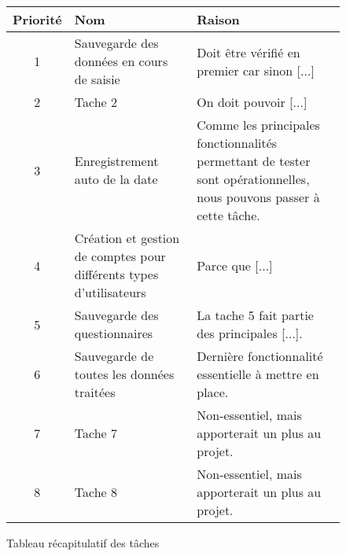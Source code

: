 \begin{figure}[H]
    \begin{center}
        \begin{tabularx}{17cm}{|c|p{6cm}|X|}
            \hline
            Priorité & Nom & Raison\\
            \hline
            1 & Sauvegarde des données en cours
            de saisie & Doit être vérifié en premier car sinon [...] \tabularnewline
            2 & Tache 2 & On doit pouvoir [...] \tabularnewline
            3 & Enregistrement auto de la date & Comme les principales fonctionnalités permettant de tester sont opérationnelles, nous pouvons passer à cette tâche. \tabularnewline
            4 & Création et gestion de comptes
            pour différents types d’utilisateurs & Parce que [...] \tabularnewline
            5 & Sauvegarde des questionnaires & La tache 5 fait partie des principales [...]. \tabularnewline
            6 & Sauvegarde de toutes les données
            traitées & Dernière fonctionnalité essentielle à mettre en place. \tabularnewline
            7 & Tache 7 & Non-essentiel, mais apporterait un plus au projet. \tabularnewline
            8 & Tache 8 & Non-essentiel, mais apporterait un plus au projet. \tabularnewline
        \end{tabularx}
    \end{center}
    \caption{Tableau récapitulatif des tâches}
\end{figure}
